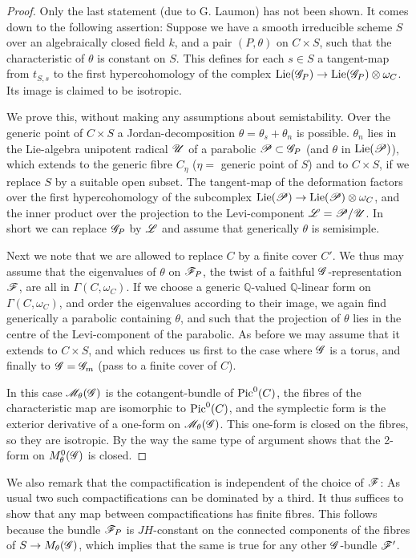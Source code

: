 \documentclass[12pt,english]{smfart}
\theoremstyle{plain} \newtheorem{innerthm}{Theorem} \newtheorem{innerlem}{Lemma} \newtheorem{innerprop}{Proposition} \newtheorem{innercor}{Corollary} \theoremstyle{definition} \newtheorem{innerdefn}{Definition} \newtheorem{innerconstr}{Construction} \theoremstyle{remark} \newtheorem*{remark}{Remark} \newtheorem*{remarks}{Remarks} \newtheorem*{applications}{Applications}
\begin{document}
\begin{proof}
Only the last statement (due to G. Laumon) has not been shown. It comes down to the following assertion: Suppose we have a smooth irreducible scheme $S$ over an algebraically closed field $k$, and a pair $(P,\theta)$ on $C\times S$, such that the characteristic of $\theta$ is constant on $S$. This defines for each $s\in S$ a tangent-map from $t_{S,s}$ to the first hypercohomology of the complex $\operatorname{Lie}(\mathscr{G}_P)\to\operatorname{Lie}(\mathscr{G}_P)\otimes\omega_C$. Its image is claimed to be isotropic.

We prove this, without making any assumptions about semistability. Over the generic point of $C\times S$ a Jordan-decomposition $\theta=\theta_s+\theta_n$ is possible. $\theta_n$ lies in the Lie-algebra unipotent radical $\mathscr{U}$ of a parabolic $\mathscr{P}\subset\mathscr{G}_P$ (and $\theta$ in $\operatorname{Lie}(\mathscr{P})$), which extends to the generic fibre $C_\eta$ ($\eta=$ generic point of $S$) and to $C\times S$, if we replace $S$ by a suitable open subset. The tangent-map of the deformation factors over the first hypercohomology of the subcomplex $\operatorname{Lie}(\mathscr{P})\to\operatorname{Lie}(\mathscr{P})\otimes\omega_C$, and the inner product over the projection to the Levi-component $\mathscr{L}=\mathscr{P}/\mathscr{U}$. In short we can replace $\mathscr{G}_P$ by $\mathscr{L}$ and assume that generically $\theta$ is semisimple.

Next we note that we are allowed to replace $C$ by a finite cover $C'$. We thus may assume that the eigenvalues of $\theta$ on $\mathscr{F}_P$, the twist of a faithful $\mathscr{G}$-representation $\mathscr{F}$, are all in $\Gamma(C,\omega_C)$. If we choose a generic $\mathbb{Q}$-valued $\mathbb{Q}$-linear form on $\Gamma(C,\omega_C)$, and order the eigenvalues according to their image, we again find generically a parabolic containing $\theta$, and such that the projection of $\theta$ lies in the centre of the Levi-component
of the parabolic. As before we may assume that it extends to $C\times S$, and which reduces us first to the case where $\mathscr{G}$ is a torus, and finally to $\mathscr{G}=\mathscr{G}_m$ (pass to a finite cover of $C$).

In this case $\mathscr{M}_\theta(\mathscr{G})$ is the cotangent-bundle of $\operatorname{Pic}^0(C)$, the fibres of the characteristic map are isomorphic to $\operatorname{Pic}^0(C)$, and the symplectic form is the exterior derivative of a one-form on $\mathscr{M}_\theta(\mathscr{G})$. This one-form is closed on the fibres, so they are isotropic. By the way the same type of argument shows that the 2-form on $M_\theta^0(\mathscr{G})$ is closed.
\end{proof}

We also remark that the compactification is independent of the choice of $\mathscr{F}$: As usual two such compactifications can be dominated by a third. It thus suffices to show that any map between compactifications has finite fibres. This follows because the bundle $\mathscr{F}_P$ is $JH$-constant on the connected components of the fibres of $S\to M_\theta(\mathscr{G})$, which implies that the same is true for any other $\mathscr{G}$-bundle $\mathscr{F}'$.
\end{document}
